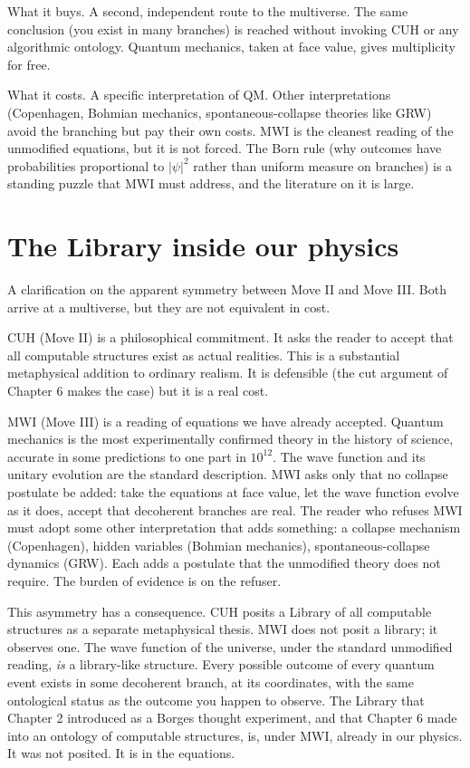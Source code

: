 What it buys. A second, independent route to the multiverse. The same conclusion (you exist in many branches) is reached without invoking CUH or any algorithmic ontology. Quantum mechanics, taken at face value, gives multiplicity for free.

What it costs. A specific interpretation of QM. Other interpretations (Copenhagen, Bohmian mechanics, spontaneous-collapse theories like GRW) avoid the branching but pay their own costs. MWI is the cleanest reading of the unmodified equations, but it is not forced. The Born rule (why outcomes have probabilities proportional to $|\psi|^2$ rather than uniform measure on branches) is a standing puzzle that MWI must address, and the literature on it is large.

\section*{The Library inside our physics}

A clarification on the apparent symmetry between Move II and Move III. Both arrive at a multiverse, but they are not equivalent in cost.

CUH (Move II) is a philosophical commitment. It asks the reader to accept that all computable structures exist as actual realities. This is a substantial metaphysical addition to ordinary realism. It is defensible (the cut argument of Chapter 6 makes the case) but it is a real cost.

MWI (Move III) is a reading of equations we have already accepted. Quantum mechanics is the most experimentally confirmed theory in the history of science, accurate in some predictions to one part in $10^{12}$. The wave function and its unitary evolution are the standard description. MWI asks only that no collapse postulate be added: take the equations at face value, let the wave function evolve as it does, accept that decoherent branches are real. The reader who refuses MWI must adopt some other interpretation that adds something: a collapse mechanism (Copenhagen), hidden variables (Bohmian mechanics), spontaneous-collapse dynamics (GRW). Each adds a postulate that the unmodified theory does not require. The burden of evidence is on the refuser.

This asymmetry has a consequence. CUH posits a Library of all computable structures as a separate metaphysical thesis. MWI does not posit a library; it observes one. The wave function of the universe, under the standard unmodified reading, \emph{is} a library-like structure. Every possible outcome of every quantum event exists in some decoherent branch, at its coordinates, with the same ontological status as the outcome you happen to observe. The Library that Chapter 2 introduced as a Borges thought experiment, and that Chapter 6 made into an ontology of computable structures, is, under MWI, already in our physics. It was not posited. It is in the equations.

